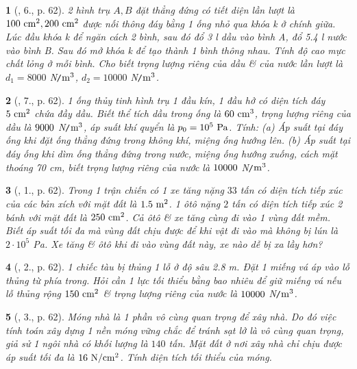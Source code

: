 \documentclass{article}
\newtheorem{baitoan}{}
\begin{document}
\begin{baitoan}[\cite{Van_Quyen_Hanh_Nhu_10_chuyen_Ly}, 6., p. 62]
	2 hình trụ $A,B$ đặt thẳng đứng có tiết diện lần lượt là $\rm100\ cm^2,200\ cm^2$ được nối thông đáy bằng 1 ống nhỏ qua khóa k ở chính giữa. Lúc đầu khóa k để ngăn cách 2 bình, sau đó đổ {\rm3 l} dầu vào bình A, đổ {\rm5.4 l} nước vào bình B. Sau đó mở khóa k để tạo thành 1 bình thông nhau. Tính độ cao mực chất lỏng ở mỗi bình. Cho biết trọng lượng riêng của dầu \& của nước lần lượt là $d_1 = 8000$ {\rm N{\tt/}$\rm m^3$}, $d_2 = 10000$ {\rm N{\tt/}$\rm m^3$}.
\end{baitoan}

\begin{baitoan}[\cite{Van_Quyen_Hanh_Nhu_10_chuyen_Ly}, 7., p. 62]
	1 ống thủy tinh hình trụ 1 đầu kín, 1 đầu hở có diện tích đáy $\rm5\ cm^2$ chứa đầy dầu. Biết thể tích dầu trong ống là $\rm60\ cm^3$, trọng lượng riêng của dầu là $\rm9000$ {\rm N{\tt/}$\rm m^3$}, áp suất khí quyển là $p_0 = 10^5\ {\rm Pa}$. Tính: (a) Áp suất tại đáy ống khi đặt ống thẳng đứng trong không khí, miệng ống hướng lên. (b) Áp suất tại đáy ống khi dìm ống thẳng đứng trong nước, miệng ống hướng xuống, cách mặt thoáng {\rm70 cm}, biết trọng lượng riêng của nước là $\rm10000$ {\rm N{\tt/}$\rm m^3$}.
\end{baitoan}

\begin{baitoan}[\cite{Van_Quyen_Hanh_Nhu_10_chuyen_Ly}, 1., p. 62]
	Trong 1 trận chiến có 1 xe tăng nặng $33$ tấn có diện tích tiếp xúc của các bản xích với mặt đất là $\rm1.5\ m^2$. 1 ôtô nặng $2$ tấn có diện tích tiếp xúc 2 bánh với mặt đất là $\rm250\ cm^2$. Cả ôtô \& xe tăng cùng đi vào 1 vùng đất mềm. Biết áp suất tối đa mà vùng đất chịu được để khi vật đi vào mà không bị lún là $2\cdot10^5$ {\rm Pa}. Xe tăng \& ôtô khi đi vào vùng đất này, xe nào dễ bị xa lầy hơn?
\end{baitoan}

\begin{baitoan}[\cite{Van_Quyen_Hanh_Nhu_10_chuyen_Ly}, 2., p. 62]
	1 chiếc tàu bị thủng 1 lỗ ở độ sâu {\rm2.8 m}. Đặt 1 miếng vá áp vào lỗ thủng từ phía trong. Hỏi cần 1 lực tối thiểu bằng bao nhiêu để giữ miếng vá nếu lỗ thủng rộng $\rm150\ cm^2$ \& trọng lượng riêng của nước là $\rm10000$ {\rm N{\tt/}$\rm m^3$}.
\end{baitoan}

\begin{baitoan}[\cite{Van_Quyen_Hanh_Nhu_10_chuyen_Ly}, 3., p. 62]
	Móng nhà là 1 phần vô cùng quan trọng để xây nhà. Do đó việc tính toán xây dựng 1 nền móng vững chắc để tránh sạt lở là vô cùng quan trọng, giả sử 1 ngôi nhà có khối lượng là $140$ tấn. Mặt đất ở nơi xây nhà chỉ chịu được áp suất tối đa là $\rm16\ N{\tt/}cm^2$. Tính diện tích tối thiểu của móng.
\end{baitoan}
\end{document}
